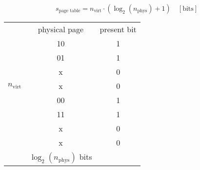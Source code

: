 \noindent\begin{equation*}
    s_{\text{page table}} = n_{\text{virt}}\cdot (\log_2(n_{\text{phys}}) + 1)\quad [\text{bits}]
\end{equation*}

\renewcommand{\arraystretch}{1.3}
\setlength{\oldtabcolsep}{\tabcolsep}\setlength\tabcolsep{6pt}
\begin{tabularx}{\linewidth}{@{} c c c@{}}
                                                                                   & physical page                  & present bit \\
    \cmidrule{2-3}
    \multirow{7}{*}{\begin{sideways}$n_{\text{virt}}$\end{sideways}} & 10                             & 1           \\
                                                                                   & 01                             & 1           \\
                                                                                   & x                              & 0           \\
                                                                                   & x                              & 0           \\
                                                                                   & 00                             & 1           \\
                                                                                   & 11                             & 1           \\
                                                                                   & x                              & 0           \\
                                                                                   & x                              & 0           \\
    \cmidrule{2-3}
                                                                                   & $\log_2(n_{\text{phys}})$ bits &
\end{tabularx}

